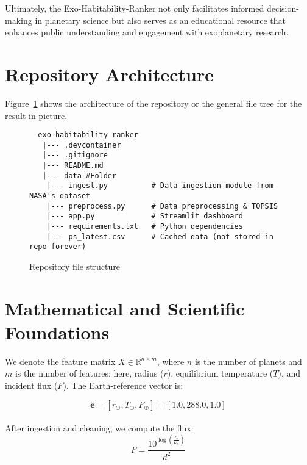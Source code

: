 \documentclass[12pt]{article}
\begin{document}
Ultimately, the Exo-Habitability-Ranker not only facilitates informed decision-making in planetary science but also serves as an educational resource that enhances public understanding and engagement with exoplanetary research.


\section{Repository Architecture}\label{sec:architecture}
Figure~\ref{fig:arch} shows the architecture of the repository or the general file tree for the result in picture.
\begin{figure}[h!]
  \centering
  \begin{verbatim}
  exo-habitability-ranker
   |--- .devcontainer
   |--- .gitignore
   |--- README.md
   |--- data #Folder
    |--- ingest.py          # Data ingestion module from NASA's dataset
    |--- preprocess.py      # Data preprocessing & TOPSIS
    |--- app.py             # Streamlit dashboard
    |--- requirements.txt   # Python dependencies
    |--- ps_latest.csv      # Cached data (not stored in repo forever)

  \end{verbatim}
  \caption{Repository file structure}\label{fig:arch}
\end{figure}

\section{Mathematical and Scientific Foundations}\label{sec:math}
We denote the feature matrix ${X} \in \mathbb{R}^{n\times m}$, where $n$ is the number of planets and $m$ is the number of features: here, radius ($r$), equilibrium temperature ($T$), and incident flux ($F$). The Earth-reference vector is:
\vspace{1em}



\begin{equation}\label{eq:earth}
  \mathbf{e} = [r_\oplus, T_\oplus, F_\oplus] = [1.0, 288.0, 1.0]
\end{equation}\\
\vspace{1em}
After ingestion and cleaning, we compute the flux: \vspace{1em}
\begin{equation}\label{eq:flux}
  F = \frac{10^{\log(\frac{L_*}{L_{\odot}})}}{d^2}
\end{equation}\\
\end{document}
